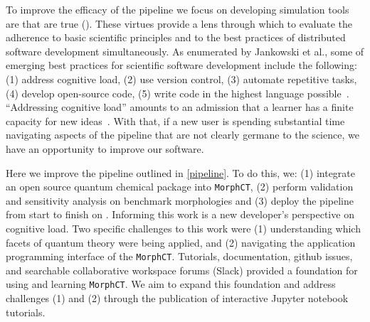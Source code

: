 To improve the efficacy of the pipeline we focus on
developing simulation tools are that are
\gls{true} (\cite{Cummings2017}).
These virtues provide a lens through which to %
evaluate the adherence to basic scientific principles and to the best practices of distributed software development
simultaneously. As enumerated by Jankowski et al., some of emerging best practices for scientific software
development include the following: (1) address cognitive load, (2) use version control, (3) automate %
repetitive tasks, (4) develop open-source code, (5) write code in the highest language possible~\cite{Jankowski2020}.
``Addressing cognitive load'' amounts to an admission that a learner has a
finite capacity for new ideas~\cite{Jankowski2019}. With that, if a new user is spending
substantial time navigating aspects of the pipeline that are not clearly
germane to the science, we have an opportunity to improve our software.

Here we improve the pipeline outlined in \autoref{pipeline}.
To do this, we: (1) integrate an open source quantum chemical package into \texttt{MorphCT},
(2) perform validation and sensitivity analysis on benchmark 
morphologies and
(3) deploy the pipeline from start to finish on . 
Informing this work is a new developer's perspective on cognitive load. 
Two specific challenges to this work were (1) understanding which facets of quantum
theory were being applied, and (2) navigating the application programming
interface of the \texttt{MorphCT}.
Tutorials, documentation, github issues, and searchable collaborative workspace
forums (Slack) provided a foundation for using and learning \texttt{MorphCT}.
We aim to expand this foundation and address challenges (1) and (2) through
the publication of interactive Jupyter notebook tutorials.

